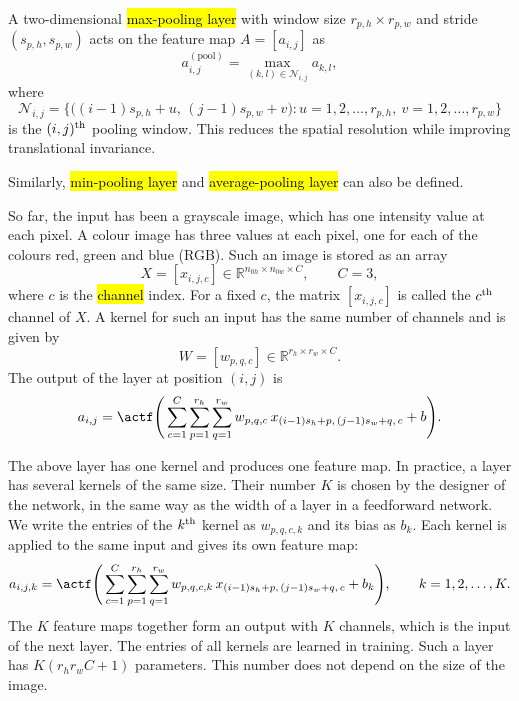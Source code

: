 \begin{remark}

A two-dimensional \hl{max-pooling layer} with window size $r_{p,h}\times r_{p,w}$ and stride $(s_{p,h}, s_{p,w})$
acts on the feature map $A = [a_{i,j}]$ as
$$
a^{(\text{pool})}_{i,j}
= \max_{(k,l)\in\mathcal{N}_{i,j}} a_{k,l},
$$
where
$$
\mathcal{N}_{i,j} = \big\{\big((i-1)s_{p,h} + u,\, (j-1)s_{p,w} + v\big) : u = 1, 2, \ldots, r_{p,h},~ v = 1, 2, \ldots, r_{p,w}\big\}
$$
is the $(i,j)^{\rm th}$ pooling window.
This reduces the spatial resolution while improving translational invariance.

Similarly, \hl{min-pooling layer} and \hl{average-pooling layer} can also be defined.
\end{remark}
\begin{remark}
So far, the input has been a grayscale image, which has one intensity value at each pixel. A colour image has three values at each pixel, one for each of the colours red, green and blue (RGB). Such an image is stored as an array
$$
X = [x_{i,j,c}] \in \mathbb{R}^{n_{0h}\times n_{0w}\times C},\qquad C = 3,
$$
where $c$ is the \hl{channel} index. For a fixed $c$, the matrix $[x_{i,j,c}]$ is called the $c^{\rm th}$ channel of $X$. A kernel for such an input has the same number of channels and is given by
$$
W = [w_{p,q,c}] \in \mathbb{R}^{r_h\times r_w\times C}.
$$
The output of the layer at position $(i,j)$ is
$$
a_{i,j} = \actf\Bigg(\sum_{c=1}^{C}\sum_{p=1}^{r_h}\sum_{q=1}^{r_w} w_{p,q,c}\, x_{(i-1)s_h + p,\,(j-1)s_w + q,\,c} + b\Bigg).
$$

The above layer has one kernel and produces one feature map. In practice, a layer has several kernels of the same size. Their number $K$ is chosen by the designer of the network, in the same way as the width of a layer in a feedforward network. We write the entries of the $k^{\rm th}$ kernel as $w_{p,q,c,k}$ and its bias as $b_k$. Each kernel is applied to the same input and gives its own feature map:
$$
a_{i,j,k} = \actf\Bigg(\sum_{c=1}^{C}\sum_{p=1}^{r_h}\sum_{q=1}^{r_w} w_{p,q,c,k}\, x_{(i-1)s_h + p,\,(j-1)s_w + q,\,c} + b_k\Bigg),\qquad k = 1, 2, \ldots, K.
$$
The $K$ feature maps together form an output with $K$ channels, which is the input of the next layer. The entries of all kernels are learned in training. Such a layer has $K(r_h r_w C + 1)$ parameters. This number does not depend on the size of the image.
\end{remark}
